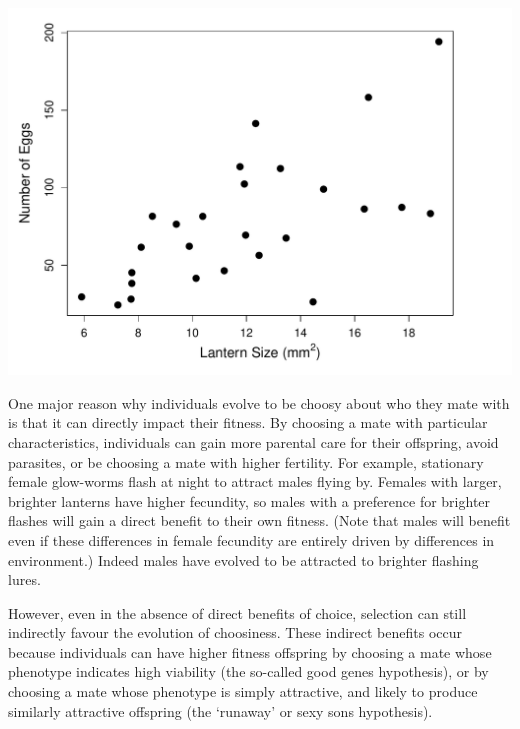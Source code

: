 \begin{marginfigure}
\begin{center}
\includegraphics[width= \textwidth]{Journal_figs/Quant_gen/glow_worm_flashes/glow_worm_flashes.pdf}
\end{center}
\caption{ } \label{fig:glow_worms_lantern}
\end{marginfigure}


One major reason why individuals evolve to be choosy about who they mate with is
that it can directly impact their fitness. By choosing a mate with
particular characteristics, individuals can gain more parental care for
their offspring, avoid parasites, or be choosing a mate with higher
fertility. For example, stationary female glow-worms flash at night to attract
males flying by. Females with larger, brighter lanterns have higher fecundity, so
males with a preference for brighter flashes will gain a direct benefit to
their own fitness. (Note that males will benefit even if these
differences in female fecundity are entirely driven by differences in
environment.) Indeed males have evolved to be attracted to brighter
flashing lures.  


However, even in the absence of direct benefits of choice, selection
can still indirectly favour the evolution of choosiness. These
indirect benefits occur because individuals can have higher fitness
offspring by choosing a mate whose phenotype indicates high viability
(the so-called good genes hypothesis), or by choosing a mate whose
phenotype is simply attractive, and likely to produce similarly
attractive offspring (the `runaway' or sexy sons hypothesis).

